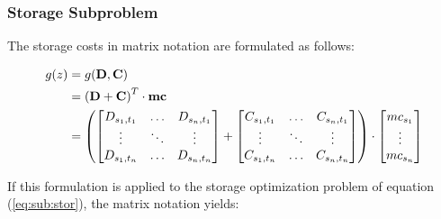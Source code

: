 \subsubsection*{Storage Subproblem}

The storage costs in matrix notation are formulated as follows:

\begin{subequations}
	\begin{align}
		g(z) &= g(\vb{D}, \vb{C})\\
		& = \left(\vb{D} + \vb{C}\right)^T \cdot \vb{mc} \\
		& = \left(\begin{bmatrix}
			D_{s_1,t_1} & \dots & D_{s_n,t_1} \\
			\vdots & \ddots & \vdots \\
			D_{s_1,t_n} & \dots & D_{s_n,t_n}
		\end{bmatrix} + \begin{bmatrix}
			C_{s_1,t_1} & \dots & C_{s_n,t_1} \\
			\vdots & \ddots & \vdots \\
			C_{s_1,t_n} & \dots & C_{s_n,t_n}
		\end{bmatrix} \right) \cdot \begin{bmatrix}
			mc_{s_1} \\
			\vdots \\
			mc_{s_n}
		\end{bmatrix}
	\end{align}
\end{subequations}

If this formulation is applied to the storage optimization problem of equation (\ref{eq:sub:stor}), the matrix notation yields:

